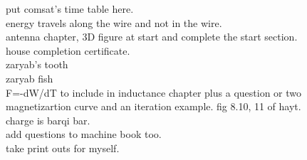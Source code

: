 \begin{otherlanguage}{english}
put comsat's time table here.\\
energy travels along the wire and not in the wire.\\
antenna chapter, 3D figure at start and complete the start section.\\
house completion certificate.\\
zaryab's tooth\\
zaryab fish\\
F=-dW/dT to include in inductance chapter plus a question or two\\
magnetizartion curve and an iteration example. fig 8.10, 11 of hayt.\\
charge is barqi bar.\\
add questions to machine book too.\\
take print outs for myself.\\

\end{otherlanguage}
